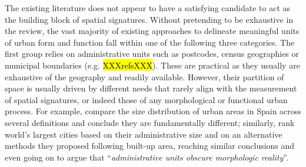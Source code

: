 The existing literature does not appear to have a satisfying candidate to act
as the building block of spatial signatures.
%
Without pretending to be exhaustive in the review, the vast majority of
existing approaches to delineate meaningful units of urban form and function
fall within one of the following three categories.
The first group relies on administrative units such as postcodes, census geographies
or municipal boundaries (e.g. \hl{XXXrefsXXX}).
%
These are practical as they usually are exhaustive of the geography and
readily available. However, their partition of space is usually driven by
different needs that rarely align with the measurement of spatial signatures,
or indeed those of any morphological or functional urban process. For example,
\cite{puente2020sensitive} compare the size distribution of urban areas in
Spain across several definitions and conclude they are fundamentally
different; similarly, \cite{taubenbock2019new} rank world's largest cities
based on their administrative size and on an alternative methods they proposed
following built-up area, reaching similar conclusions and even going on to
argue that ``\emph{administrative units obscure morphologic reality}''.




